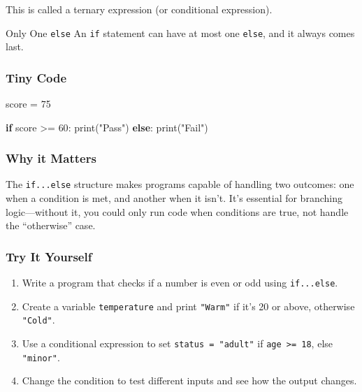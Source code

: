 \documentclass[
  letterpaper,
  DIV=11,
  numbers=noendperiod]{scrreprt}
\newenvironment{Shaded}{\begin{snugshade}}{\end{snugshade}}
\newcommand{\BuiltInTok}[1]{\textcolor[rgb]{0.00,0.23,0.31}{#1}}
\newcommand{\ControlFlowTok}[1]{\textcolor[rgb]{0.00,0.23,0.31}{\textbf{#1}}}
\newcommand{\DecValTok}[1]{\textcolor[rgb]{0.68,0.00,0.00}{#1}}
\newcommand{\NormalTok}[1]{\textcolor[rgb]{0.00,0.23,0.31}{#1}}
\newcommand{\OperatorTok}[1]{\textcolor[rgb]{0.37,0.37,0.37}{#1}}
\newcommand{\StringTok}[1]{\textcolor[rgb]{0.13,0.47,0.30}{#1}}
\providecommand{\tightlist}{%
  \setlength{\itemsep}{0pt}\setlength{\parskip}{0pt}}
\begin{document}
This is called a ternary expression (or conditional expression).

Only One \texttt{else} An \texttt{if} statement can have at most one
\texttt{else}, and it always comes last.

\subsubsection{Tiny Code}\label{tiny-code-14}

\begin{Shaded}
\begin{Highlighting}[]
\NormalTok{score }\OperatorTok{=} \DecValTok{75}

\ControlFlowTok{if}\NormalTok{ score }\OperatorTok{\textgreater{}=} \DecValTok{60}\NormalTok{:}
    \BuiltInTok{print}\NormalTok{(}\StringTok{"Pass"}\NormalTok{)}
\ControlFlowTok{else}\NormalTok{:}
    \BuiltInTok{print}\NormalTok{(}\StringTok{"Fail"}\NormalTok{)}
\end{Highlighting}
\end{Shaded}

\subsubsection{Why it Matters}\label{why-it-matters-14}

The \texttt{if...else} structure makes programs capable of handling two
outcomes: one when a condition is met, and another when it isn't. It's
essential for branching logic---without it, you could only run code when
conditions are true, not handle the ``otherwise'' case.

\subsubsection{Try It Yourself}\label{try-it-yourself-14}

\begin{enumerate}
\def\labelenumi{\arabic{enumi}.}
\tightlist
\item
  Write a program that checks if a number is even or odd using
  \texttt{if...else}.
\item
  Create a variable \texttt{temperature} and print \texttt{"Warm"} if
  it's 20 or above, otherwise \texttt{"Cold"}.
\item
  Use a conditional expression to set \texttt{status\ =\ "adult"} if
  \texttt{age\ \textgreater{}=\ 18}, else \texttt{"minor"}.
\item
  Change the condition to test different inputs and see how the output
  changes.
\end{enumerate}
\end{document}
